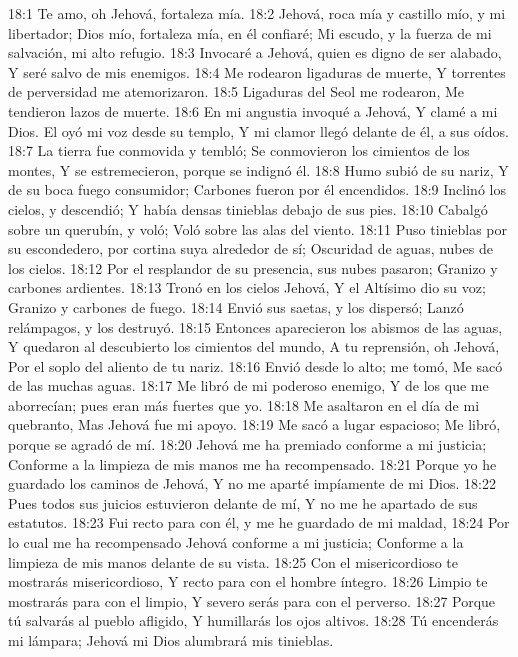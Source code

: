 18:1 Te amo, oh Jehová, fortaleza mía. 
18:2 Jehová, roca mía y castillo mío, y mi libertador; 
Dios mío, fortaleza mía, en él confiaré; 
Mi escudo, y la fuerza de mi salvación, mi alto refugio. 
18:3 Invocaré a Jehová, quien es digno de ser alabado, 
Y seré salvo de mis enemigos. 
18:4 Me rodearon ligaduras de muerte, 
Y torrentes de perversidad me atemorizaron. 
18:5 Ligaduras del Seol me rodearon, 
Me tendieron lazos de muerte. 
18:6 En mi angustia invoqué a Jehová, 
Y clamé a mi Dios. 
El oyó mi voz desde su templo, 
Y mi clamor llegó delante de él, a sus oídos. 
18:7 La tierra fue conmovida y tembló; 
Se conmovieron los cimientos de los montes, 
Y se estremecieron, porque se indignó él. 
18:8 Humo subió de su nariz, 
Y de su boca fuego consumidor; 
Carbones fueron por él encendidos. 
18:9 Inclinó los cielos, y descendió; 
Y había densas tinieblas debajo de sus pies. 
18:10 Cabalgó sobre un querubín, y voló; 
Voló sobre las alas del viento. 
18:11 Puso tinieblas por su escondedero, por cortina suya alrededor de sí; 
Oscuridad de aguas, nubes de los cielos. 
18:12 Por el resplandor de su presencia, sus nubes pasaron; 
Granizo y carbones ardientes. 
18:13 Tronó en los cielos Jehová, 
Y el Altísimo dio su voz; 
Granizo y carbones de fuego. 
18:14 Envió sus saetas, y los dispersó; 
Lanzó relámpagos, y los destruyó. 
18:15 Entonces aparecieron los abismos de las aguas, 
Y quedaron al descubierto los cimientos del mundo, 
A tu reprensión, oh Jehová, 
Por el soplo del aliento de tu nariz. 
18:16 Envió desde lo alto; me tomó, 
Me sacó de las muchas aguas. 
18:17 Me libró de mi poderoso enemigo, 
Y de los que me aborrecían; pues eran más fuertes que yo. 
18:18 Me asaltaron en el día de mi quebranto, 
Mas Jehová fue mi apoyo. 
18:19 Me sacó a lugar espacioso; 
Me libró, porque se agradó de mí. 
18:20 Jehová me ha premiado conforme a mi justicia; 
Conforme a la limpieza de mis manos me ha recompensado. 
18:21 Porque yo he guardado los caminos de Jehová, 
Y no me aparté impíamente de mi Dios. 
18:22 Pues todos sus juicios estuvieron delante de mí, 
Y no me he apartado de sus estatutos. 
18:23 Fui recto para con él, y me he guardado de mi maldad, 
18:24 Por lo cual me ha recompensado Jehová conforme a mi justicia; 
Conforme a la limpieza de mis manos delante de su vista. 
18:25 Con el misericordioso te mostrarás misericordioso, 
Y recto para con el hombre íntegro. 
18:26 Limpio te mostrarás para con el limpio, 
Y severo serás para con el perverso. 
18:27 Porque tú salvarás al pueblo afligido, 
Y humillarás los ojos altivos. 
18:28 Tú encenderás mi lámpara; 
Jehová mi Dios alumbrará mis tinieblas. 

